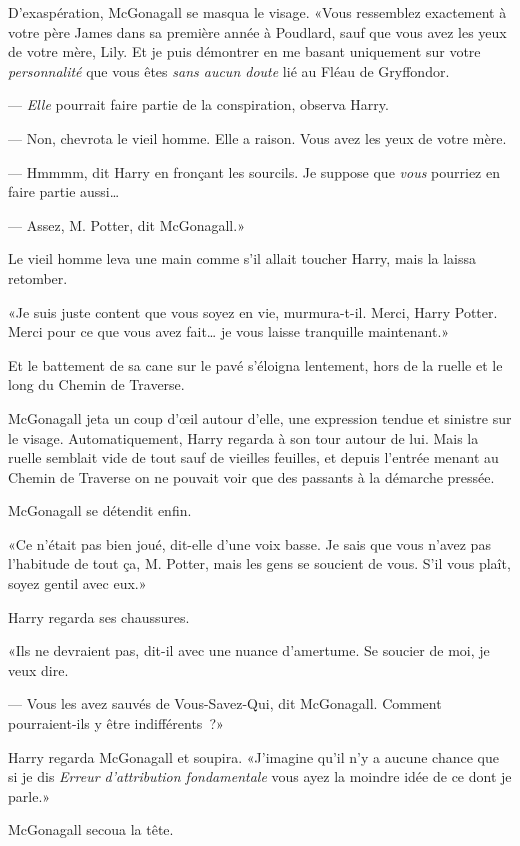 D'exaspération, McGonagall se masqua le visage.
«Vous ressemblez exactement à votre père James dans sa première année à Poudlard, sauf que vous avez les yeux de votre mère, Lily. Et je puis démontrer en me basant uniquement sur votre \emph{personnalité} que vous êtes \emph{sans aucun doute} lié au Fléau de Gryffondor.

--- \emph{Elle} pourrait faire partie de la conspiration, observa Harry.

--- Non, chevrota le vieil homme. Elle a raison. Vous avez les yeux de votre mère.

--- Hmmmm, dit Harry en fronçant les sourcils. Je suppose que \emph{vous} pourriez en faire partie aussi…

--- Assez, M. Potter, dit McGonagall.»

Le vieil homme leva une main comme s'il allait toucher Harry, mais la laissa retomber.

«Je suis juste content que vous soyez en vie, murmura-t-il. Merci, Harry Potter. Merci pour ce que vous avez fait… je vous laisse tranquille maintenant.»

Et le battement de sa cane sur le pavé s'éloigna lentement, hors de la ruelle et le long du Chemin de Traverse.

McGonagall jeta un coup d'œil autour d'elle, une expression tendue et sinistre sur le visage. Automatiquement, Harry regarda à son tour autour de lui. Mais la ruelle semblait vide de tout sauf de vieilles feuilles, et depuis l'entrée menant au Chemin de Traverse on ne pouvait voir que des passants à la démarche pressée.

McGonagall se détendit enfin.

«Ce n'était pas bien joué, dit-elle d'une voix basse. Je sais que vous n'avez pas l'habitude de tout ça, M. Potter, mais les gens se soucient de vous. S'il vous plaît, soyez gentil avec eux.»

Harry regarda ses chaussures.

«Ils ne devraient pas, dit-il avec une nuance d'amertume. Se soucier de moi, je veux dire.

--- Vous les avez sauvés de Vous-Savez-Qui, dit McGonagall. Comment pourraient-ils y être indifférents~?»

Harry regarda McGonagall et soupira. «J'imagine qu'il n'y a aucune chance que si je dis \emph{Erreur d'attribution fondamentale} vous ayez la moindre idée de ce dont je parle.»

McGonagall secoua la tête.

